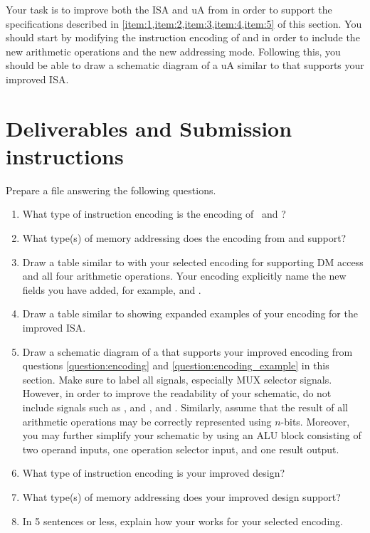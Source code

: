 \documentclass[number=03]{assignment}
\begin{document}
Your task is to improve both the \ac{ISA} and \ac{uA} from  in order to support the specifications described in \cref{item:1,item:2,item:3,item:4,item:5} of this section.
You should start by modifying the instruction encoding of  and  in order to include the new arithmetic operations and the new addressing mode.
Following this, you should be able to draw a schematic diagram of a \ac{uA} similar to  that supports your improved \ac{ISA}. 
%
\section{Deliverables and Submission instructions}\label{Sec:Deliverables}
Prepare a  file answering the following questions.
\begin{enumerate}
\item {} What type of instruction encoding is the encoding of~ and ?
\item {} What type(s) of memory addressing does the encoding from  and  support?
\item {} Draw a table similar to  with your selected encoding for supporting \ac{DM} access and all four arithmetic operations.
Your encoding  explicitly name the new fields you have added, for example,  and .\label{question:encoding}
\item {} Draw a table similar to  showing  expanded examples of your encoding for the improved \ac{ISA}.\label{question:encoding_example}
\item {} Draw a schematic diagram of a \uA that supports your improved encoding from questions \ref{question:encoding} and \ref{question:encoding_example} in this section.
Make sure to label all signals, especially \ac{MUX} selector signals. 
However, in order to improve the readability of your schematic, do not include signals such as ,  and ,  and .
Similarly, assume that the result of all arithmetic operations may be correctly represented using $n$-bits.
Moreover, you may further simplify your schematic by using an \ac{ALU} block consisting of two operand inputs, one operation selector input, and one result output.
\item {} What type of instruction encoding is your improved design?
\item {} What type(s) of memory addressing does your improved design support?
\item {} In 5 sentences or less, explain how your \uA works for your selected encoding.
\end{enumerate} 
\end{document}
